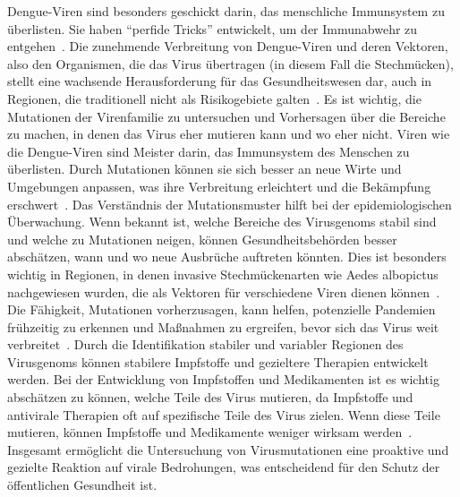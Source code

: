 \documentclass[german,version-2022-01]{uzl-thesis}
\begin{document}
\begin{figure}[tbp]
\end{figure} Dengue-Viren sind besonders geschickt darin, das menschliche Immunsystem zu \"uberlisten. Sie haben "`perfide Tricks"' entwickelt, um der Immunabwehr zu entgehen~\cite{janisch_klein_2017}. Die zunehmende Verbreitung von Dengue-Viren und deren Vektoren, also den Organismen, die das Virus \"ubertragen (in diesem Fall die Stechm\"ucken), stellt eine wachsende Herausforderung f\"ur das Gesundheitswesen dar, auch in Regionen, die traditionell nicht als Risikogebiete galten~\cite{cramer_dengue-virus_2014}. Es ist wichtig, die Mutationen der Virenfamilie zu untersuchen und Vorhersagen \"uber die Bereiche zu machen, in denen das Virus eher mutieren kann und wo eher nicht. Viren wie die Dengue-Viren sind Meister darin, das Immunsystem des Menschen zu \"uberlisten. Durch Mutationen k\"onnen sie sich besser an neue Wirte und Umgebungen anpassen, was ihre Verbreitung erleichtert und die Bek\"ampfung erschwert~\cite{cramer_dengue-virus_2014, janisch_klein_2017}. Das Verst\"andnis der Mutationsmuster hilft bei der epidemiologischen \"Uberwachung. Wenn bekannt ist, welche Bereiche des Virusgenoms stabil sind und welche zu Mutationen neigen, k\"onnen Gesundheitsbeh\"orden besser absch\"atzen, wann und wo neue Ausbr\"uche auftreten k\"onnten. Dies ist besonders wichtig in Regionen, in denen invasive Stechm\"uckenarten wie Aedes albopictus nachgewiesen wurden, die als Vektoren f\"ur verschiedene Viren dienen k\"onnen~\cite{cramer_dengue-virus_2014}. Die F\"ahigkeit, Mutationen vorherzusagen, kann helfen, potenzielle Pandemien fr\"uhzeitig zu erkennen und Ma\ss{}nahmen zu ergreifen, bevor sich das Virus weit verbreitet~\cite{janisch_klein_2017}. Durch die Identifikation stabiler und variabler Regionen des Virusgenoms k\"onnen stabilere Impfstoffe und gezieltere Therapien entwickelt werden. Bei der Entwicklung von Impfstoffen und Medikamenten ist es wichtig absch\"atzen zu k\"onnen, welche Teile des Virus mutieren, da Impfstoffe und antivirale Therapien oft auf spezifische Teile des Virus zielen. Wenn diese Teile mutieren, k\"onnen Impfstoffe und Medikamente weniger wirksam werden~\cite{janisch_klein_2017}. 
Insgesamt erm\"oglicht die Untersuchung von Virusmutationen eine proaktive und gezielte Reaktion auf virale Bedrohungen, was entscheidend f\"ur den Schutz der \"offentlichen Gesundheit ist.
\end{document}
